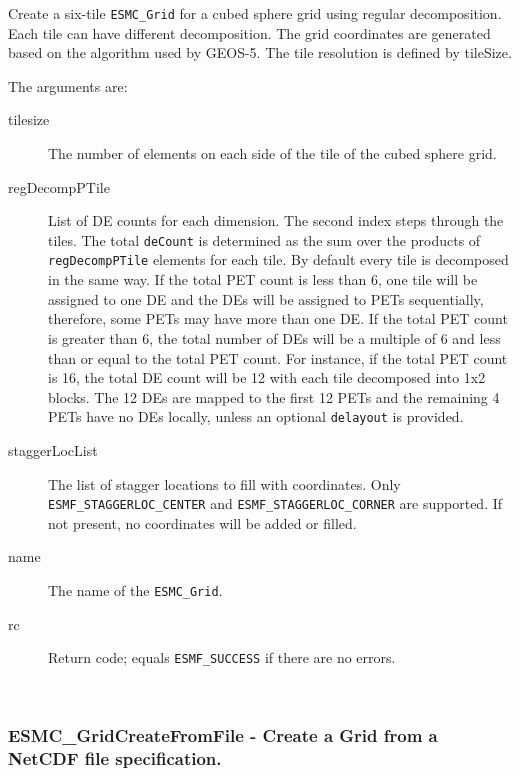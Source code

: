   
    Create a six-tile {\tt ESMC\_Grid} for a cubed sphere grid using regular
    decomposition.  Each tile can have different decomposition. The grid
    coordinates are generated based on the algorithm used by GEOS-5. The tile
    resolution is defined by tileSize.
  
    The arguments are:
    \begin{description}
    \item[tilesize]
        The number of elements on each side of the tile of the cubed sphere grid.
    \item[regDecompPTile]
        List of DE counts for each dimension. The second index steps through
        the tiles. The total {\tt deCount} is determined as the sum over
        the products of {\tt regDecompPTile} elements for each tile.
        By default every tile is decomposed in the same way.  If the total
        PET count is less than 6, one tile will be assigned to one DE and the DEs
        will be assigned to PETs sequentially, therefore, some PETs may have
        more than one DE. If the total PET count is greater than 6, the total
        number of DEs will be a multiple of 6 and less than or equal to the total
        PET count. For instance, if the total PET count is 16, the total DE count
        will be 12 with each tile decomposed into 1x2 blocks. The 12 DEs are mapped
        to the first 12 PETs and the remaining 4 PETs have no DEs locally, unless
        an optional {\tt delayout} is provided.
    \item[staggerLocList]
        The list of stagger locations to fill with coordinates. Only {\tt ESMF\_STAGGERLOC\_CENTER} and
        {\tt ESMF\_STAGGERLOC\_CORNER} are supported. If not present, no coordinates will be added or filled.
    \item[name]
        The name of the {\tt ESMC\_Grid}.
    \item[rc]
        Return code; equals {\tt ESMF\_SUCCESS} if there are no errors.
    \end{description}
   
 
\mbox{}\hrulefill\ 
 
\subsubsection [ESMC\_GridCreateFromFile] {ESMC\_GridCreateFromFile - Create a Grid from a NetCDF file specification.}


